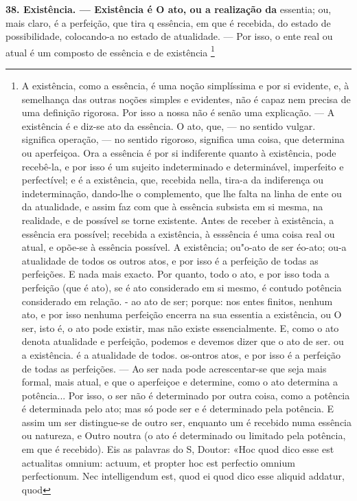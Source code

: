 \documentclass[12pt,a4paper]{article}
\newcommand{\pagmark}[1]{\quad[\textit{p.\,#1}]\quad}
\begin{document}
{{{{{{{{{\medskip\noindent\textbf{38. Existência. — Existência é O ato, ou a realização da}
\pagmark{310}
essentia; ou, mais claro, é a perfeição, que tira q essência, em
que é recebida, do estado de possibilidade, colocando-a no estado
de atualidade. — Por isso, o ente real ou atual é um composto de essência e de existência \footnote{A existência, como a essência, é uma noção simplíssima e por si
evidente, e, à semelhança das outras noções simples e evidentes, não é capaz nem precisa de uma definição rigorosa. Por isso a nossa não é senão
uma explicação. — A existência é e diz-se ato da essência. O ato, que, —
no sentido vulgar. significa operação, — no sentido rigoroso, significa uma
coisa, que determina ou aperfeiçoa. Ora a essência é por si indiferente
quanto à existência, pode recebê-la, e por isso é um sujeito indeterminado
e determinável, imperfeito e perfectível; e é a existência, que, recebida nella,
tira-a da indiferença ou indeterminação, dando-lhe o complemento, que lhe
falta na linha de ente ou da atualidade, e assim faz com que à essência
subsista em si mesma, na realidade, e de possível se torne existente. Antes
de receber à existência, a essência era possível; recebida a existência, à esssência é uma coisa real ou atual, e opõe-se à essência possível.
 A existência;
 ou"o-ato de ser éo-ato; ou-a atualidade de todos os
outros atos, e por isso é a perfeição de todas as perfeições. E nada mais
exacto. Por quanto, todo o ato, e por isso toda a perfeição (que é ato), se
é ato considerado em si mesmo, é contudo potência considerado em relação. -
ao ato de ser; porque: nos entes finitos, nenhum ato, e por isso nenhuma
perfeição encerra na sua essentia a existência, ou O ser, isto é, o ato pode
existir, mas não existe essencialmente. E, como o ato denota atualidade e
perfeição, podemos e devemos dizer que o ato de ser. ou a existência. é a
atualidade de todos. os-ontros atos, e por isso é a perfeição de todas as
perfeições. — Ao ser nada pode acrescentar-se que seja mais formal, mais
atual, e que o aperfeiçoe e determine, como o ato determina a potência...
Por isso, o ser não é determinado por outra coisa, como a potência é determinada pelo ato; mas só pode ser e é determinado pela potência. E assim
um ser distingue-se de outro ser, enquanto um é recebido numa essência
ou natureza, e Outro noutra (o ato é determinado ou limitado pela potência,
em que é recebido). Eis as palavras do S, Doutor: «Hoc quod dico esse est
actualitas omnium: actuum, et propter hoc est perfectio omnium perfectionum. Nec intelligendum est, quod ei quod dico esse aliquid addatur, quod
}}}}}}}}}}
\end{document}

